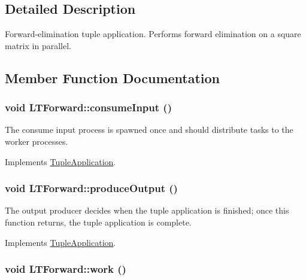 \subsection{Detailed Description}
Forward-elimination tuple application. Performs forward elimination on a square matrix in parallel. 

\subsection{Member Function Documentation}
\hypertarget{class_l_t_forward_6f3bbdf720e1899b0df8a8f222727086}{
\subsubsection[{consumeInput}]{\setlength{\rightskip}{0pt plus 5cm}void LTForward::consumeInput ()}}
\label{class_l_t_forward_6f3bbdf720e1899b0df8a8f222727086}


The consume input process is spawned once and should distribute tasks to the worker processes. 

Implements \hyperlink{class_tuple_application_e163c5a536de01c8b94b49528a17dab2}{TupleApplication}.\hypertarget{class_l_t_forward_56c27cd419407319f95afa4e7d43409a}{
\subsubsection[{produceOutput}]{\setlength{\rightskip}{0pt plus 5cm}void LTForward::produceOutput ()}}
\label{class_l_t_forward_56c27cd419407319f95afa4e7d43409a}


The output producer decides when the tuple application is finished; once this function returns, the tuple application is complete. 

Implements \hyperlink{class_tuple_application_8743dfcf17dedd52887c0b2ab170d8dc}{TupleApplication}.\hypertarget{class_l_t_forward_d98aff7a063bf6e8542046c6f2c097fa}{
\subsubsection[{work}]{\setlength{\rightskip}{0pt plus 5cm}void LTForward::work ()}}
\label{class_l_t_forward_d98aff7a063bf6e8542046c6f2c097fa}


